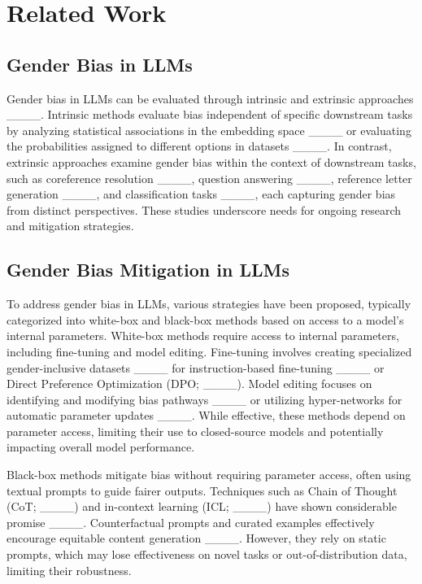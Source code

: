 \section{Related Work}
\subsection{Gender Bias in LLMs}
Gender bias in LLMs can be evaluated through intrinsic and extrinsic approaches ____. Intrinsic methods evaluate bias independent of specific downstream tasks by analyzing statistical associations in the embedding space ____ or evaluating the probabilities assigned to different options in datasets ____.
In contrast, extrinsic approaches examine gender bias within the context of downstream tasks, such as coreference resolution ____, question answering ____, reference letter generation ____, and classification tasks ____, each capturing gender bias from distinct perspectives. These studies underscore needs for ongoing research and mitigation strategies.
\vspace{-0.5em}

\subsection{Gender Bias Mitigation in LLMs}
To address gender bias in LLMs, various strategies have been proposed, typically categorized into white-box and black-box methods based on access to a model's internal parameters.
White-box methods require access to internal parameters, including fine-tuning and model editing. Fine-tuning involves creating specialized gender-inclusive datasets ____ for instruction-based fine-tuning ____ or Direct Preference Optimization (DPO; ____). Model editing focuses on identifying and modifying bias pathways ____ or utilizing hyper-networks for automatic parameter updates ____. While effective, these methods depend on parameter access, limiting their use to closed-source models and potentially impacting overall model performance.

Black-box methods mitigate bias without requiring parameter access, often using textual prompts to guide fairer outputs. Techniques such as Chain of Thought (CoT; ____) and in-context learning (ICL; ____) have shown considerable promise ____. Counterfactual prompts and curated examples effectively encourage equitable content generation ____. However, they rely on static prompts, which may lose effectiveness on novel tasks or out-of-distribution data, limiting their robustness.
\vspace{-0.5em}

